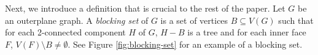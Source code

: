 \documentclass{cccg16}
\begin{document}
%

Next, we introduce a definition that is crucial to the rest of the paper.
Let $G$ be an outerplane graph. A \emph{blocking set} of $G$ is a set
of vertices $B \subseteq V(G)$ such that for each 2-connected component
$H$ of $G$, $H-B$ is a tree and for each inner face $F$,
$V(F) \setminus B \ne \emptyset$.  See Figure \ref{fig:blocking-set}
for an example of a blocking set.
\end{document}
